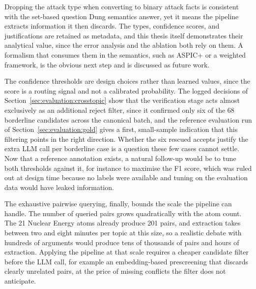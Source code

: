 Dropping the attack type when converting to binary attack facts is consistent
with the set-based question Dung semantics answer, yet it means the pipeline
extracts information it then discards. The types, confidence scores, and
justifications are retained as metadata, and this thesis itself demonstrates
their analytical value, since the error analysis and the ablation both rely on
them. A formalism that consumes them in the semantics, such as ASPIC+ or a
weighted framework, is the obvious next step and is discussed as future work.

The confidence thresholds are design choices rather than learned values, since
the score is a routing signal and not a calibrated probability. The logged
decisions of Section~\ref{sec:evaluation:crosstopic} show that the
verification stage acts almost
exclusively as an additional reject filter, since it confirmed only six of the
68 borderline candidates across the canonical batch, and the reference evaluation run of
Section~\ref{sec:evaluation:gold} gives a first, small-sample indication that
this filtering points in the right direction. Whether the six rescued accepts
justify the extra LLM call per borderline case is a question these few cases
cannot settle. Now that a reference annotation exists, a natural follow-up
would be to tune both thresholds against it, for instance to maximise the F1
score, which was ruled out at design time because no labels were available
and tuning on the evaluation data would have leaked information.

The exhaustive pairwise querying, finally, bounds the scale the pipeline can
handle. The number of queried pairs grows quadratically with the atom count.
The 21 Nuclear Energy atoms already produce 201 pairs, and extraction takes
between two and eight minutes per topic at this size, so a realistic debate with
hundreds of arguments would produce tens of thousands of pairs and hours of
extraction. Applying the pipeline at that scale requires a cheaper candidate
filter before the LLM call, for example an embedding-based prescreening that
discards clearly unrelated pairs, at the price of missing conflicts the
filter does not anticipate.
